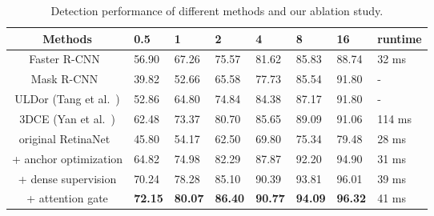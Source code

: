 \documentclass[runningheads,a4paper]{llncs}
\begin{document}
\begin{table}[t]
    \centering
    \caption{Detection performance of different methods and our ablation study.}
    \vspace{1mm}
    \begin{tabular}{c|p{1.0cm}<{\centering}p{1.0cm}<{\centering}p{1.0cm}<{\centering}p{1.0cm}<{\centering}p{1.0cm}<{\centering}p{1.0cm}<{\centering}|p{1.3cm}<{\centering}}
    \toprule
     Methods                       & 0.5 & 1 & 2 & 4 & 8 & 16 & runtime \\
     \midrule
     Faster R-CNN~\cite{ren2015faster}      & 56.90 & 67.26 & 75.57 & 81.62 & 85.83 & 88.74 & 32 ms\\
     Mask R-CNN~\cite{he2017mask}              & 39.82 & 52.66 & 65.58 & 77.73 & 85.54 & 91.80 & - \\
     ULDor (Tang et al.~\cite{tang2019uldor})  & 52.86 & 64.80 & 74.84 & 84.38 & 87.17 & 91.80 & -\\
     3DCE (Yan et al.~\cite{yan20183dce})      & 62.48 & 73.37 & 80.70 & 85.65 & 89.09 & 91.06 & 114 ms\\
     \midrule
     original RetinaNet~\cite{lin2017focal}    & 45.80 & 54.17 & 62.50 & 69.80 & 75.34 & 79.48 & 28 ms \\
+ anchor optimization                     & 64.82 & 74.98 & 82.29 & 87.87 & 92.20 & 94.90 & 31 ms\\
     + dense supervision                       & 70.24 & 78.28 & 85.10 & 90.39 & 93.81 & 96.01 & 39 ms \\
     + attention gate                              & \textbf{72.15} & \textbf{80.07} & \textbf{86.40} & \textbf{90.77} & \textbf{94.09} & \textbf{96.32} & 41 ms \\
\bottomrule
    \end{tabular}
    \vspace{-3mm}
    \label{tab:detection}
\end{table}





\begin{comment}
\begin{table}[]
\centering
     \caption{Comparison of our proposed method with others on DeepLesion dataset.}
     \vspace{1mm}
     \begin{tabular}{c|cc|ccc|c}
     \hline
      Methods                       & 4FP & 5FP  & 10mm & 10-30mm & 30mm & runtime (ms)\\
      \hline
      Faster R-CNN   & 79.44 & 81.1 & - & - & - & - \\
      Mask R-CNN     & 77.73 & - & - & - & - & - \\
      miccai'18      & 85.65 & - & 80 & 87 & 84 & 114 \\
      isbi'19        & 84.38 & - & - & - & - & - \\
      ours           & 90.82 & 92.20 & 88.40 & 91.88 & 92.56 & 40.8 \\
      \hline
     \end{tabular}
     \label{tab:my_label}
 \end{table}
\end{comment}
\end{document}
